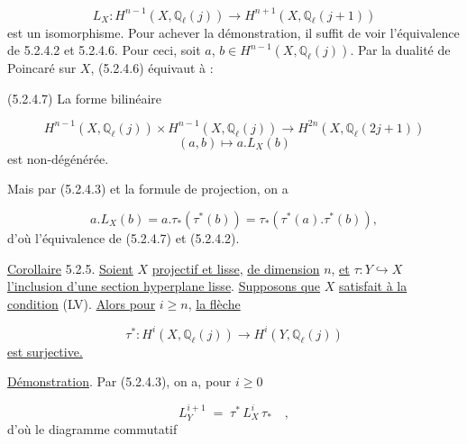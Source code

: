 \begin{equation}\tag{5.2.4.6}
L_X : H^{n-1}(X,\mathbb{Q}_\ell(j)) \longrightarrow H^{n+1}(X,\mathbb{Q}_\ell(j+1))
\end{equation}
est un isomorphisme. Pour achever la démonstration, il suffit de voir l'équivalence de 5.2.4.2 et 5.2.4.6. Pour ceci, soit $a$, $b \in H^{n-1}(X,\mathbb{Q}_\ell(j))$. Par la dualité de Poincaré sur $X$, (5.2.4.6) équivaut à :

(5.2.4.7) La forme bilinéaire

\begin{equation}\tag{5.2.4.7}
H^{n-1}(X,\mathbb{Q}_\ell(j))\times H^{n-1}(X,\mathbb{Q}_\ell(j)) \longrightarrow H^{2n}(X,\mathbb{Q}_\ell(2j+1))
\end{equation}
\begin{equation*}
(a,b) \longmapsto a.L_X(b)
\end{equation*}
est non-dégénérée.



Mais par (5.2.4.3) et la formule de projection, on a

\begin{equation*}
a.L_X(b) = a.\tau_*(\tau^*(b)) = \tau_*(\tau^*(a).\tau^*(b)),
\end{equation*}
d'où l'équivalence de (5.2.4.7) et (5.2.4.2).

\underline{Corollaire} 5.2.5. \underline{Soient} $X$ \underline{projectif et lisse}, \underline{de dimension} $n$, \underline{et} $\tau : Y \hookrightarrow X$ \underline{l'inclusion d'une section hyperplane lisse}. \underline{Supposons que} $X$ \underline{satisfait à la condition} (LV). \underline{Alors pour} $i \geq n$, \underline{la flèche}

\begin{equation*}
\tau^* : H^i(X,\mathbb{Q}_\ell(j)) \longrightarrow H^i(Y,\mathbb{Q}_\ell(j))
\end{equation*}
\underline{est surjective.}

\underline{Démonstration}. Par (5.2.4.3), on a, pour $i \geq 0$

\begin{equation*}
L_Y^{i+1} \;=\; \tau^* \, L_X^i \, \tau_* \quad ,
\end{equation*}
d'où le diagramme commutatif

